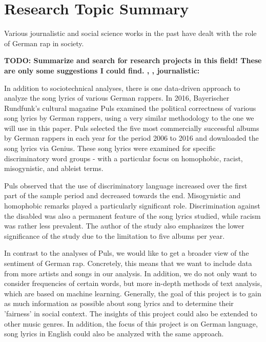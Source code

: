 \section{Research Topic Summary}\label{sec:research}

Various journalistic and social science works in the past have dealt with the role of German rap in society.

\textbf{TODO: Summarize and search for research projects in this field! These are only some suggestions I could find.
\cite{heinisch2018schlampe},
\cite{ahlers_2019},
\cite{wiegel2011deutscher}
journalistic:
\cite{rohwer_2020}}

In addition to sociotechnical analyses, there is one data-driven approach to analyze the song lyrics of various German rappers. In 2016, Bayerischer Rundfunk's cultural magazine Puls \cite{puls_2016} examined the political correctness of various song lyrics by German rappers, using a very similar methodology to the one we will use in this paper. Puls selected the five most commercially successful albums by German rappers in each year for the period 2006 to 2016 and downloaded the song lyrics via Genius. These song lyrics were examined for specific discriminatory word groups - with a particular focus on homophobic, racist, misogynistic, and ableist terms.

Puls observed that the use of discriminatory language increased over the first part of the sample period and decreased towards the end. Misogynistic and homophobic remarks played a particularly significant role. Discrimination against the disabled was also a permanent feature of the song lyrics studied, while racism was rather less prevalent. The author of the study also emphasizes the lower significance of the study due to the limitation to five albums per year.

In contrast to the analyses of Puls, we would like to get a broader view of the sentiment of German rap. Concretely, this means that we want to include data from more artists and songs in our analysis. In addition, we do not only want to consider frequencies of certain words, but more in-depth methods of text analysis, which are based on machine learning. Generally, the goal of this project is to gain as much information as possible about song lyrics and to determine their 'fairness' in social context. The insights of this project could also be extended to other music genres. In addition, the focus of this project is on German language, song lyrics in English could also be analyzed with the same approach.

